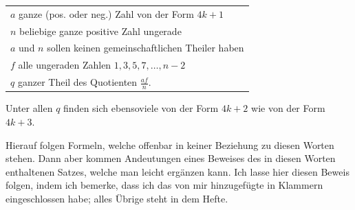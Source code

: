 \begin{center}\begin{tabular}{@{}l@{}}
\(a\) ganze (pos. oder neg.) Zahl von der Form \(4k+1\)\\
\(n\) beliebige ganze positive Zahl ungerade\\
\(a\) und \(n\) sollen keinen gemeinschaftlichen Theiler haben\\
\(f\) alle ungeraden Zahlen \(1,3,5,7,\ldots,n-2\)\\
\(q\) ganzer Theil des Quotienten \(\frac{af}n\).
\end{tabular}\end{center}
\noindent\hspace*{\parindent}Unter allen \(q\) finden sich ebensoviele von der Form \(4k+2\) wie von der Form \(4k+3\).

Hierauf folgen Formeln, welche offenbar in keiner Beziehung zu diesen Worten stehen. Dann aber kommen Andeutungen eines Beweises des in diesen Worten enthaltenen Satzes, welche man leicht ergänzen kann. Ich lasse hier diesen Beweis folgen, indem ich bemerke, dass ich das von mir hinzugefügte in Klammern eingeschlossen habe; alles Übrige steht in dem Hefte.

